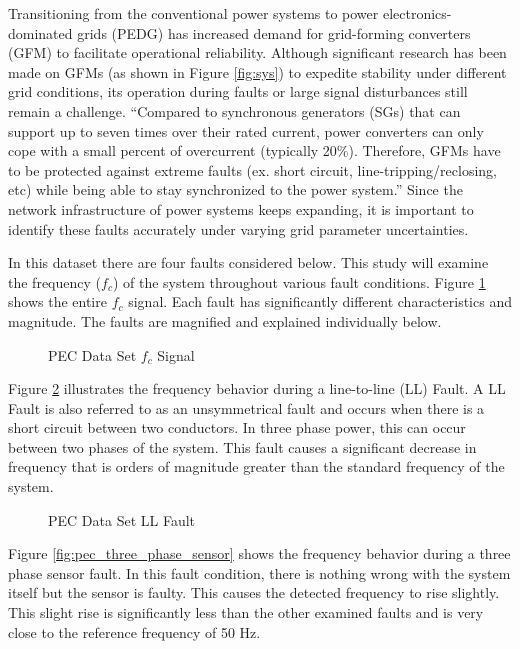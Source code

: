 Transitioning from the conventional power systems to power electronics-dominated grids (PEDG) has increased demand for grid-forming converters (GFM) to facilitate operational reliability. Although significant research has been made on GFMs (as shown in Figure \ref{fig:sys}) to expedite stability under different grid conditions, its operation during faults or large signal disturbances still remain a challenge. \enquote{Compared to synchronous generators (SGs) that can support up to seven times over their rated current, power converters can only cope with a small percent of overcurrent (typically 20\%). Therefore, GFMs have to be protected against extreme faults (ex. short circuit, line-tripping/reclosing, etc) while being able to stay synchronized to the power system.}\parencite{trainsient-stability-9523750} Since the network infrastructure of power systems keeps expanding, it is important to identify these faults accurately under varying grid parameter uncertainties.

In this dataset there are four faults considered below. This study will examine the frequency ($f_c$) of the system throughout various fault conditions. Figure \ref{fig:pec_all} shows the entire $f_c$ signal. Each fault has significantly different characteristics and magnitude. The faults are magnified and explained individually below.

\begin{figure}[H]
    
    \caption{PEC Data Set $f_c$ Signal}
    \label{fig:pec_all}
\end{figure}

Figure \ref{fig:pec_ll_fault} illustrates the frequency behavior during a line-to-line (LL) Fault. A LL Fault is also referred to as an unsymmetrical fault and occurs when there is a short circuit between two conductors. In three phase power, this can occur between two phases of the system. This fault causes a significant decrease in frequency that is orders of magnitude greater than the standard frequency of the system. 

\begin{figure}[H]
    
    \caption{PEC Data Set LL Fault}
    \label{fig:pec_ll_fault}
\end{figure}

Figure \ref{fig:pec_three_phase_sensor} shows the frequency behavior during a three phase sensor fault. In this fault condition, there is nothing wrong with the system itself but the sensor is faulty. This causes the detected frequency to rise slightly. This slight rise is significantly less than the other examined faults and is very close to the reference frequency of 50 Hz. 

